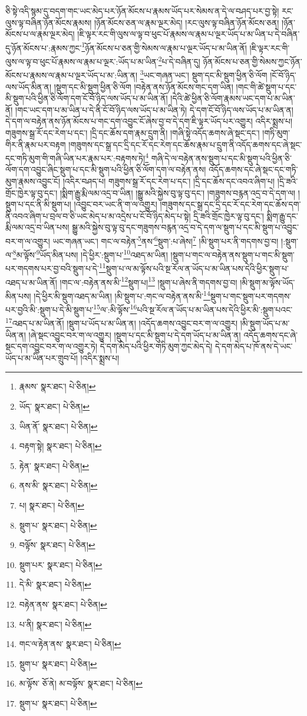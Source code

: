 ཅི་སྟེ་འདི་སྙམ་དུ་བདག་གང་ཡང་མེད་པར་ཉོན་མོངས་པ་རྣམས་ཡོད་པར་སེམས་ན་དེ་ལ་བཤད་པར་བྱ་སྟེ། རང་ལུས་ལྟ་བཞིན་ཉོན་མོངས་རྣམས། །ཉོན་མོངས་ཅན་ལ་རྣམ་ལྔར་མེད། །རང་ལུས་ལྟ་བཞིན་ཉོན་མོངས་ཅན། །ཉོན་མོངས་པ་ལ་རྣམ་ལྔར་མེད། །ཇི་ལྟར་རང་གི་ལུས་ལ་ལྟ་བ་ཕུང་པོ་རྣམས་ལ་རྣམ་པ་ལྔར་ཡོད་པ་མ་ཡིན་པ་དེ་བཞིན་དུ་ཉོན་མོངས་པ་:རྣམས་ཀྱང་\footnote{རྣམས་  སྣར་ཐང་།  པེ་ཅིན། }ཉོན་མོངས་པ་ཅན་གྱི་སེམས་ལ་རྣམ་པ་ལྔར་ཡོད་པ་མ་ཡིན་ནོ། །ཇི་ལྟར་རང་གི་ལུས་ལ་ལྟ་བ་ཕུང་པོ་རྣམས་ལ་རྣམ་པ་ལྔར་:ཡོད་པ་མ་ཡིན་\footnote{ཡོད་  སྣར་ཐང་།  པེ་ཅིན། }པ་དེ་བཞིན་དུ། ཉོན་མོངས་པ་ཅན་གྱི་སེམས་ཀྱང་ཉོན་མོངས་པ་རྣམས་ལ་རྣམ་པ་ལྔར་ཡོད་པ་མ་:ཡིན་ན། \footnote{ཡིན་ནོ་  སྣར་ཐང་།  པེ་ཅིན། }ཡང་གཞན་ཡང་། སྡུག་དང་མི་སྡུག་ཕྱིན་ཅི་ལོག །ངོ་བོ་ཉིད་ལས་ཡོད་མིན་ན། །སྡུག་དང་མི་སྡུག་ཕྱིན་ཅི་ལོག །བརྟེན་ནས་ཉོན་མོངས་གང་དག་ཡིན། །གང་གི་ཚེ་སྡུག་པ་དང་མི་སྡུག་པའི་ཕྱིན་ཅི་ལོག་དག་ངོ་བོ་ཉིད་ལས་ཡོད་པ་མ་ཡིན་ནོ། །དེའི་ཚེ་ཕྱིན་ཅི་ལོག་རྣམས་ཡང་དག་པ་མ་ཡིན་ནོ། །གང་ཡང་དག་པ་མ་ཡིན་པ་དེ་ནི་ངོ་བོ་ཉིད་ལས་ཡོད་པ་མ་ཡིན་ཏེ། དེ་དག་ངོ་བོ་ཉིད་ལས་ཡོད་པ་མ་ཡིན་ན། དེ་དག་ལ་བརྟེན་ནས་ཉོན་མོངས་པ་གང་དག་འབྱུང་ངོ་ཞེས་བྱ་བ་དེ་དག་ཇི་ལྟར་ཡོད་པར་འགྱུར། འདིར་སྨྲས་པ། གཟུགས་སྒྲ་རོ་དང་རེག་པ་དང་། །དྲི་དང་ཆོས་དག་རྣམ་དྲུག་ནི། །གཞི་སྟེ་འདོད་ཆགས་ཞེ་སྡང་དང་། །གཏི་མུག་གིར་ནི་རྣམ་པར་བརྟག །གཟུགས་དང་སྒྲ་དང་དྲི་དང་རོ་དང་རེག་དང་ཆོས་རྣམ་པ་དྲུག་ནི་འདོད་ཆགས་དང་ཞེ་སྡང་དང་གཏི་མུག་གི་གཞི་ཡིན་པར་རྣམ་པར་:བརྟགས་ཏེ།\footnote{བརྟག་སྟེ།  སྣར་ཐང་།  པེ་ཅིན། } གཞི་དེ་ལ་བརྟེན་ནས་སྡུག་པ་དང་མི་སྡུག་པའི་ཕྱིན་ཅི་ལོག་དག་འབྱུང་ཞིང་སྡུག་པ་དང་མི་སྡུག་པའི་ཕྱིན་ཅི་ལོག་དག་ལ་བརྟེན་ནས། འདོད་ཆགས་དང་ཞེ་སྡང་དང་གཏི་མུག་རྣམས་འབྱུང་ངོ། །འདིར་བཤད་པ། གཟུགས་སྒྲ་རོ་དང་རེག་པ་དང་། །དྲི་དང་ཆོས་དང་འབའ་ཞིག་པ། །དྲི་ཟའི་གྲོང་ཁྱེར་ལྟ་བུ་དང་། །སྨིག་རྒྱུ་རྨི་ལམ་འདྲ་བ་ཡིན། །སྒྱུ་མའི་སྐྱེས་བུ་ལྟ་བུ་དང་། །གཟུགས་བརྙན་འདྲ་བ་དེ་དག་ལ། །སྡུག་པ་དང་ནི་མི་སྡུག་པ། །འབྱུང་བར་ཡང་ནི་ག་ལ་འགྱུར། །གཟུགས་དང་སྒྲ་དང་དྲི་དང་རོ་དང་རེག་དང་ཆོས་དག་ནི་འབའ་ཞིག་པ་བྲལ་བ་ཅི་ཡང་མེད་པ་མ་འདྲེས་པ་ངོ་བོ་ཉིད་མེད་པ་སྟེ། དྲི་ཟའི་གྲོང་ཁྱེར་ལྟ་བུ་དང་། སྨིག་རྒྱུ་དང་རྨི་ལམ་འདྲ་བ་ཡིན་པས། སྒྱུ་མའི་སྐྱེས་བུ་ལྟ་བུ་དང་གཟུགས་བརྙན་འདྲ་བ་དེ་དག་ལ་སྡུག་པ་དང་མི་སྡུག་པ་འབྱུང་བར་ག་ལ་འགྱུར། ཡང་གཞན་ཡང་། གང་ལ་བརྟེན་\footnote{རྟེན་  སྣར་ཐང་།  པེ་ཅིན། }ནས་\footnote{ནས་མི་  སྣར་ཐང་།  པེ་ཅིན། }སྡུག་:པ་ཞེས།\footnote{པ།  སྣར་ཐང་།  པེ་ཅིན། } །མི་སྡུག་པར་ནི་གདགས་བྱ་བ། །:སྡུག་ལ་\footnote{སྡུག་པ་  སྣར་ཐང་།  པེ་ཅིན། }མ་ལྟོས་\footnote{བལྟོས་  སྣར་ཐང་།  པེ་ཅིན། }ཡོད་མིན་པས། །དེ་ཕྱིར་:སྡུག་པ་\footnote{སྡུག་པར་  སྣར་ཐང་།  པེ་ཅིན། }འཐད་མ་ཡིན། །སྡུག་པ་གང་ལ་བརྟེན་ནས་སྡུག་པ་གང་མི་སྡུག་པར་གདགས་པར་བྱ་བའི་སྡུག་པ་དེ་\footnote{དེ་མི་  སྣར་ཐང་།  པེ་ཅིན། }སྡུག་པ་ལ་མ་ལྟོས་པའི་སྔ་རོལ་ན་ཡོད་པ་མ་ཡིན་པས་དེའི་ཕྱིར་སྡུག་པ་འཐད་པ་མ་ཡིན་ནོ། །གང་ལ་:བརྟེན་ནས་མི་\footnote{བརྟེན་ནས་  སྣར་ཐང་།  པེ་ཅིན། }སྡུག་པ།\footnote{པ་ནི།  སྣར་ཐང་།  པེ་ཅིན། } །སྡུག་པ་ཞེས་ནི་གདགས་བྱ་བ། །མི་སྡུག་མ་ལྟོས་ཡོད་མིན་པས། །དེ་ཕྱིར་མི་སྡུག་འཐད་མ་ཡིན། །མི་སྡུག་པ་:གང་ལ་བརྟེན་ནས་མི་\footnote{གང་ལ་རྟེན་ནས་  སྣར་ཐང་།  པེ་ཅིན། }སྡུག་པ་གང་སྡུག་པར་གདགས་པར་བྱའི་མི་:སྡུག་པ་དེ་མི་སྡུག་པ་\footnote{སྡུག་པ་  སྣར་ཐང་།  པེ་ཅིན། }ལ་:མི་ལྟོས་\footnote{མ་ལྟོས་  ཅོ་ནེ། མ་བལྟོས་  སྣར་ཐང་།  པེ་ཅིན། }པའི་སྔ་རོལ་ན་ཡོད་པ་མ་ཡིན་པས་དེའི་ཕྱིར་མི་:སྡུག་པའང་\footnote{སྡུག་པ་  སྣར་ཐང་།  པེ་ཅིན། }འཐད་པ་མ་ཡིན་ནོ། །སྡུག་པ་ཡོད་པ་མ་ཡིན་ན། །འདོད་ཆགས་འབྱུང་བར་ག་ལ་འགྱུར། །མི་སྡུག་ཡོད་པ་མ་ཡིན་ན། །ཞེ་སྡང་འབྱུང་བར་ག་ལ་འགྱུར། །སྡུག་པ་དང་མི་སྡུག་པ་དེ་དག་ཡོད་པ་མ་ཡིན་ན། འདོད་ཆགས་དང་ཞེ་སྡང་དག་འབྱུང་བར་ག་ལ་འགྱུར་ཏེ། དེ་དག་མེད་པའི་ཕྱིར་གཏི་མུག་ཀྱང་མེད་དེ། དེ་དག་མེད་པ་ཁོ་ནས་དེ་ཡང་ཡོད་པ་མ་ཡིན་པར་གྲུབ་པོ། །འདིར་སྨྲས་པ། 